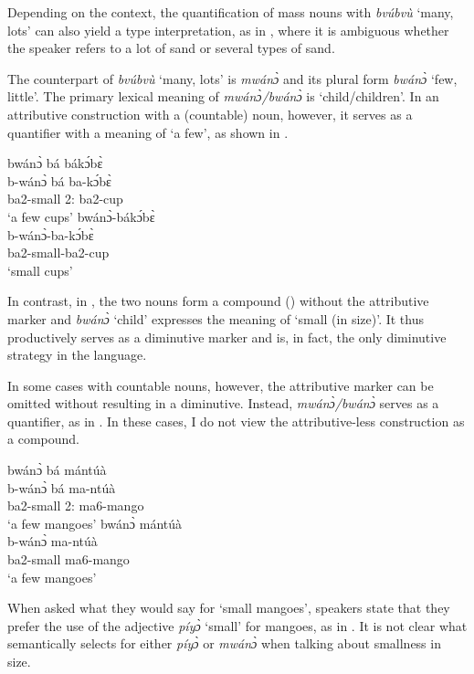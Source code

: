 Depending on the context, the quantification of mass nouns with {\itshape bvúbvù} `many, lots' can also yield a type interpretation, as in , where it is ambiguous whether the speaker refers to a lot of sand or several types of sand. 

The counterpart of {\itshape bvúbvù} `many, lots' is {\itshape mwánɔ̀} and its plural form {\itshape bwánɔ̀} `few, little'. The primary lexical meaning of {\itshape mwánɔ̀/bwánɔ̀} is `child/children'. In an attributive construction with a (countable) noun, however, it serves as a quantifier with a meaning of  `a few', as shown in .

\ea\label{small}
\ea\label{small1}
 \glll bwánɔ̀ bá bákɔ́bɛ̀  \\     
 b-wánɔ̀ bá ba-kɔ́bɛ̀  \\
             ba2-small 2:{\ATT} ba2-cup  \\
    \trans `a few cups'
\ex \label{small2}
  \glll   bwánɔ̀-bákɔ́bɛ̀  \\   
  b-wánɔ̀-ba-kɔ́bɛ̀  \\
    ba2-small-ba2-cup \\
    \trans `small cups'
\z
\z

In contrast, in , the two nouns form a compound () without the attributive marker and {\itshape bwánɔ̀} `child' expresses the meaning of `small (in size)'. It thus productively serves as a diminutive marker and is, in fact, the only diminutive strategy in the language.

In some cases with countable nouns, however, the attributive marker can be omitted without resulting in a diminutive. Instead, {\itshape mwánɔ̀/bwánɔ̀} serves as a quantifier, as in . In these cases, I do not view the attributive-less construction as a compound.

\ea\label{ntua}
\ea \label{ntua1}
  \glll    bwánɔ̀ bá mántúà  \\
  b-wánɔ̀ bá ma-ntúà  \\
    ba2-small 2:{\ATT} ma6-mango \\
    \trans `a few mangoes'
\ex\label{ntua2}
 \glll    bwánɔ̀ mántúà  \\
 b-wánɔ̀ ma-ntúà  \\
             ba2-small ma6-mango  \\
    \trans `a few mangoes'
\z
\z

When asked what they would say for `small mangoes', speakers state that they prefer the use of the adjective {\itshape píyɔ̀} `small' for mangoes, as in . It is not clear what semantically selects for either {\itshape píyɔ̀} or {\itshape mwánɔ̀} when talking about smallness in size.

